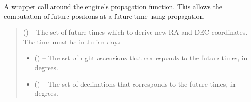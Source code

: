 \documentclass[letterpaper,11pt,english]{sphinxmanual}
\begin{document}
\begin{savenotes}
\begin{fulllineitems}
\begin{savenotes}\begin{fulllineitems}
\label{\detokenize{code/opihiexarata.propagate.solution:opihiexarata.propagate.solution.PropagativeSolution.forward_propagate}}
\pysigstartsignatures
{}
\pysigstopsignatures
\sphinxAtStartPar
A wrapper call around the engine’s propagation function. This
allows the computation of future positions at a future time using
propagation.
\begin{quote}\begin{description}
\sphinxAtStartPar
{} () – The set of future times which to derive new RA and DEC coordinates.
The time must be in Julian days.

\sphinxAtStartPar
\begin{itemize}
\item {} 
\sphinxAtStartPar
{} () – The set of right ascensions that corresponds to the future times,
in degrees.

\item {} 
\sphinxAtStartPar
{} () – The set of declinations that corresponds to the future times, in
degrees.

\end{itemize}


\end{description}\end{quote}

\end{fulllineitems}\end{savenotes}


\end{fulllineitems}\end{savenotes}

\end{document}
